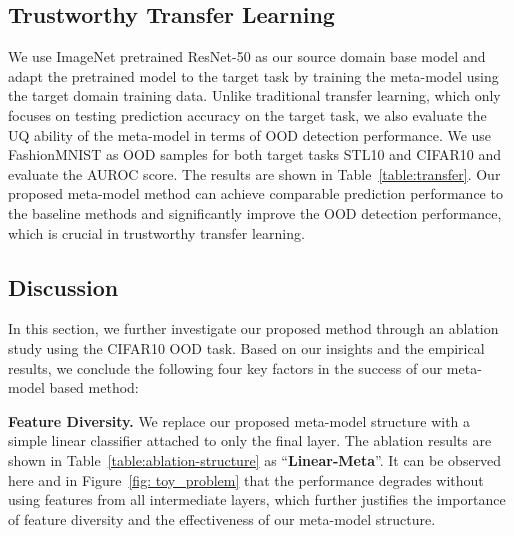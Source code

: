 \subsection{Trustworthy Transfer Learning}\label{sec:transfer}
We use ImageNet pretrained ResNet-50 as our source domain base model and adapt the pretrained model to the target task by training the meta-model using the target domain training data. Unlike traditional transfer learning, which only focuses on testing prediction accuracy on the target task, we also evaluate the UQ ability of the meta-model in terms of OOD detection performance. We use FashionMNIST as OOD samples for both target tasks STL10 and CIFAR10 and evaluate the AUROC score. The results are shown in Table~\ref{table:transfer}. Our proposed meta-model method can achieve comparable prediction performance to the baseline methods and significantly improve the OOD detection performance, which is crucial in trustworthy transfer learning.



\subsection{Discussion}\label{sec:ablation}


In this section, we further investigate our proposed method through an ablation study using the CIFAR10 OOD task. Based on our insights and the empirical results, we conclude the following four key factors in the success of our meta-model based method:

\textbf{Feature Diversity.}
We replace our proposed meta-model structure with a simple linear classifier attached to only the final layer. The ablation results are shown in Table~\ref{table:ablation-structure} as ``\textbf{Linear-Meta}''. It can be observed here and in Figure~\ref{fig: toy_problem} that the performance degrades without using features from all intermediate layers, which further justifies the importance of feature diversity and the effectiveness of our meta-model structure. 




